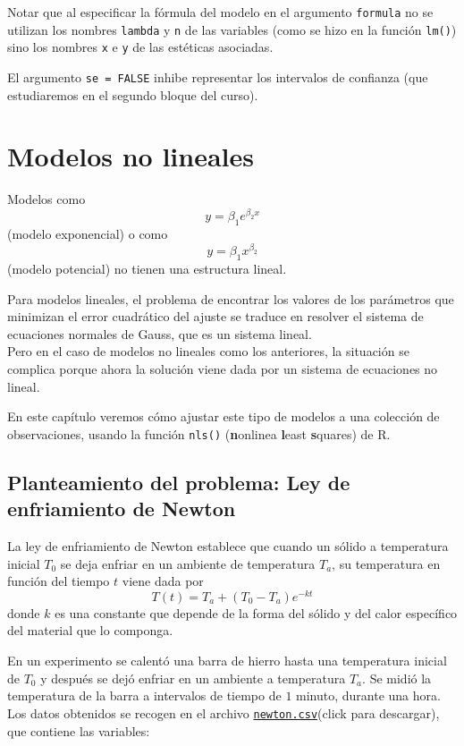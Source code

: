 \documentclass[
  degree=mecinf,
  title=normal,
  toc=normal,
  bib=normal]{mnye}
\begin{document}
Notar que al especificar la fórmula del modelo en el argumento \texttt{formula} no se utilizan los nombres \texttt{lambda} y \texttt{n} de las variables (como se hizo en la función \texttt{lm()}) sino los nombres \texttt{x} e \texttt{y} de las estéticas asociadas.

El argumento \texttt{se\ =\ FALSE} inhibe representar los intervalos de confianza (que estudiaremos en el segundo bloque del curso).

\hypertarget{nls}{%
\section{Modelos no lineales}\label{nls}}

Modelos como
\[y = \beta_1 e^{\beta_2 x}\]
(modelo exponencial) o como
\[y = \beta_1x^{\beta_2}\]
(modelo potencial) no tienen una estructura lineal.

Para modelos lineales, el problema de encontrar los valores de los parámetros que minimizan el error cuadrático del ajuste se traduce en resolver el sistema de ecuaciones normales de Gauss, que es un sistema lineal.\\
Pero en el caso de modelos no lineales como los anteriores, la situación se complica porque ahora la solución viene dada por un sistema de ecuaciones no lineal.

En este capítulo veremos cómo ajustar este tipo de modelos a una colección de observaciones, usando la función \texttt{nls()} (\textbf{n}onlinea \textbf{l}east \textbf{s}quares) de \textsf{R}.

\hypertarget{planteamiento-del-problema-ley-de-enfriamiento-de-newton}{%
\subsection{Planteamiento del problema: Ley de enfriamiento de Newton}\label{planteamiento-del-problema-ley-de-enfriamiento-de-newton}}

La ley de enfriamiento de Newton establece que cuando un sólido a temperatura inicial \(T_0\) se deja enfriar en un ambiente de temperatura \(T_a\), su temperatura en función del tiempo \(t\) viene dada por
\[T(t)=T_a+(T_0-T_a)e^{-kt}\]
donde \(k\) es una constante que depende de la forma del sólido y del calor específico del material que lo componga.

En un experimento se calentó una barra de hierro hasta una temperatura inicial de \(T_0\) y después se dejó enfriar en un ambiente a temperatura \(T_a\). Se midió la temperatura de la barra a intervalos de tiempo de \(1\) minuto, durante una hora. Los datos obtenidos se recogen en el archivo \href{https://drive.google.com/uc?export=download\&id=1mpF0_lZVw-u2SlrxJDwczEI4x_OxO1W2}{\texttt{newton.csv}}(click para descargar), que contiene las variables:
\end{document}
